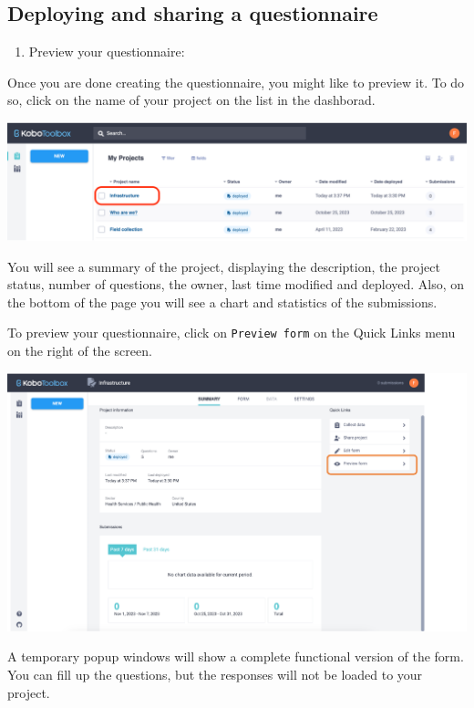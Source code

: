 \documentclass[
  letterpaper,
  DIV=11,
  numbers=noendperiod]{scrartcl}
\providecommand{\tightlist}{%
  \setlength{\itemsep}{0pt}\setlength{\parskip}{0pt}}\usepackage{longtable,booktabs,array}
\begin{document}
\subsection{Deploying and sharing a
questionnaire}\label{deploying-and-sharing-a-questionnaire}

\begin{enumerate}
\def\labelenumi{\arabic{enumi}.}
\tightlist
\item
  Preview your questionnaire:
\end{enumerate}

Once you are done creating the questionnaire, you might like to preview
it. To do so, click on the name of your project on the list in the
dashborad.

\includegraphics{kobotoolbox_tutorial_files/img/img11.png}

You will see a summary of the project, displaying the description, the
project status, number of questions, the owner, last time modified and
deployed. Also, on the bottom of the page you will see a chart and
statistics of the submissions.

To preview your questionnaire, click on \texttt{Preview\ form} on the
Quick Links menu on the right of the screen.

\includegraphics{kobotoolbox_tutorial_files/img/img12.png}

A temporary popup windows will show a complete functional version of the
form. You can fill up the questions, but the responses will not be
loaded to your project.
\end{document}
